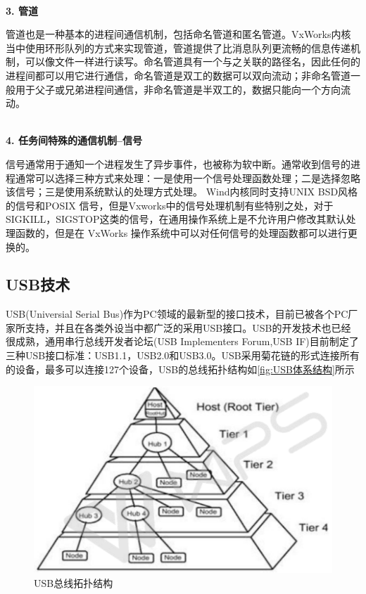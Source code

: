 \\	
	
	\noindent \textbf{3. 管道}
	
	管道也是一种基本的进程间通信机制，包括命名管道和匿名管道。VxWorks内核当中使用环形队列的方式来实现管道，管道提供了比消息队列更流畅的信息传递机制，可以像文件一样进行读写。命名管道具有一个与之关联的路径名，因此任何的进程间都可以用它进行通信，命名管道是双工的数据可以双向流动；非命名管道一般用于父子或兄弟进程间通信，非命名管道是半双工的，数据只能向一个方向流动。

\\
	
\noindent \textbf{4. 任务间特殊的通信机制--信号} 

	信号通常用于通知一个进程发生了异步事件，也被称为软中断。通常收到信号的进程通常可以选择三种方式来处理：一是使用一个信号处理函数处理；二是选择忽略该信号；三是使用系统默认的处理方式处理。
Wind内核同时支持UNIX BSD风格的信号和POSIX 信号，但是Vxworks中的信号处理机制有些特别之处，对于SIGKILL，SIGSTOP这类的信号，在通用操作系统上是不允许用户修改其默认处理函数的，但是在 VxWorks 操作系统中可以对任何信号的处理函数都可以进行更换的。



\subsection{USB技术}
	USB(Universial Serial Bus)作为PC领域的最新型的接口技术，目前已被各个PC厂家所支持，并且在各类外设当中都广泛的采用USB接口。USB的开发技术也已经很成熟，通用串行总线开发者论坛(USB Implementers Forum,USB IF)目前制定了三种USB接口标准：USB1.1，USB2.0和USB3.0。USB采用菊花链的形式连接所有的设备，最多可以连接127个设备，USB的总线拓扑结构如\autoref{fig:USB体系结构}所示
\begin{figure}[!h]
\centering
\includegraphics[width=1.0\textwidth]{./graphics/usb-structure.pdf}
\caption{USB总线拓扑结构}\label{fig:USB体系结构}
\end{figure}


